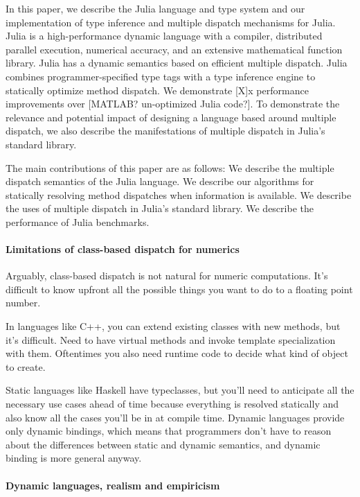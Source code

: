 In this paper, we describe the Julia language and type system and our implementation of type inference and multiple dispatch mechanisms for Julia. Julia is a high-performance dynamic language with a compiler, distributed parallel execution, numerical accuracy, and an extensive mathematical function library. Julia has a dynamic semantics based on efficient multiple dispatch. Julia combines programmer-specified type tags with a type inference engine to statically optimize method dispatch. We demonstrate [X]x performance improvements over [MATLAB? un-optimized Julia code?]. To demonstrate the relevance and potential impact of designing a language based around multiple dispatch, we also describe the manifestations of multiple dispatch in Julia's standard library.

The main contributions of this paper are as follows:
We describe the multiple dispatch semantics of the Julia language.
We describe our algorithms for statically resolving method dispatches when information is available.
We describe the uses of multiple dispatch in Julia's standard library.
We describe the performance of Julia benchmarks. 

\paragraph{Limitations of class-based dispatch for numerics} %

Arguably, class-based dispatch is not natural for numeric computations. It's difficult to know upfront all the possible things you want to do to a floating point number.

In languages like C++, you can extend existing classes with new methods, but it's difficult. Need to have virtual methods and invoke template specialization with them. Oftentimes you also need runtime code to decide what kind of object to create.

Static languages like Haskell have typeclasses\cite{typeclass}, but you'll need to anticipate all the necessary use cases ahead of time because everything is resolved statically and also know all the cases you'll be in at compile time. Dynamic languages provide only dynamic bindings,  which means that programmers don't have to reason about the differences between static and dynamic semantics, and dynamic binding is more general anyway.

\paragraph{Dynamic languages, realism and empiricism}

